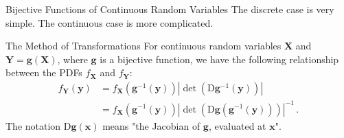 \documentclass[10pt]{beamer}
\begin{document}
\begin{frame}[fragile]{Bijective Functions of Continuous Random Variables}
The discrete case is very simple. The continuous case is more complicated.
\begin{alertblock}{The Method of Transformations}
For continuous random variables \(\bm{X}\) and \(\bm{Y} = \bm{g}\left(\bm{X}\right)\), where \(\bm{g}\) is a bijective function, we have the following relationship between the PDFs \(f_{\bm{X}}\) and \(f_{\bm{Y}}\):
\begin{equation*}
    \begin{aligned}
        f_{\bm{Y}}\left(\bm{y}\right) &= f_{\bm{X}}\left(\bm{g}^{-1}\left(\bm{y}\right)\right)\left|\det\left(\mathrm{D}\bm{g}^{-1}\left(\bm{y}\right)\right)\right|\\
        &= f_{\bm{X}}\left(\bm{g}^{-1}\left(\bm{y}\right)\right)\left|\det\left(\mathrm{D}\bm{g}\left(\bm{g}^{-1}\left(\bm{y}\right)\right)\right)\right|^{-1}\,.
    \end{aligned}
\end{equation*}
The notation \(\mathrm{D}\bm{g}\left(\bm{x}\right)\) means "the Jacobian of \(\bm{g}\), evaluated at \(\bm{x}\)".
\end{alertblock}
\end{frame}
\end{document}
